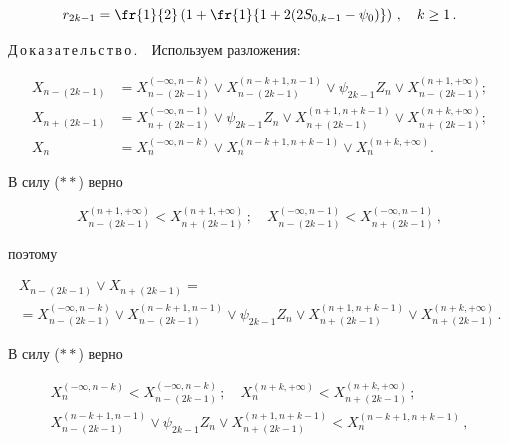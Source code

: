 $$


r_{2k-1}=\fr{1}{2}\left(1+\fr{1}{1+2(2S_{0,k-1}-\psi_0)}\right)\,,\quad 


k\ge 1\,.


$$





\noindent


Д\,о\,к\,а\,з\,а\,т\,е\,л\,ь\,с\,т\,в\,о\,.\ \ Используем разложения:


\begin{align*}


X_{n-(2k-1)}&=


X_{n-(2k-1)}^{(-\infty,n-k)}\vee X_{n-(2k-1)}^{(n-k+1,n-1)}\vee 


\psi_{2k-1}Z_n\vee X_{n-(2k-1)}^{(n+1,+\infty)};\\


X_{n+(2k-1)}&=


X_{n+(2k-1)}^{(-\infty,n-1)}\vee \psi_{2k-1} Z_n\vee X_{n+(2k-1)}^{(n+1,n+k-1)}


\vee X_{n+(2k-1)}^{(n+k,+\infty)};\\ 


X_n&=X_n^{(-\infty,n-k)}\vee X_n^{(n-k+1,n+k-1)}\vee X_n^{(n+k,+\infty)}.


\end{align*}


В силу ($**$) верно


$$


X_{n-(2k-1)}^{(n+1,+\infty)}<X_{n+(2k-1)}^{(n+1,+\infty)}\,;\quad


X_{n-(2k-1)}^{(-\infty,n-1)}<X_{n+(2k-1)}^{(-\infty,n-1)}\,,


$$


поэтому


\begin{multline*}


X_{n-(2k-1)}\vee X_{n+(2k-1)}={}\\


{}=


X_{n-(2k-1)}^{(-\infty,n-k)}\vee X_{n-(2k-1)}^{(n-k+1,n-1)}\vee \psi_{2k-1}Z_n\vee


X_{n+(2k-1)}^{(n+1,n+k-1)}\vee X_{n+(2k-1)}^{(n+k,+\infty)}\,.


\end{multline*}


В силу ($**$) верно


\begin{gather*}


X_n^{(-\infty,n-k)}<X_{n-(2k-1)}^{(-\infty,n-k)}\,;\quad


X_n^{(n+k,+\infty)}<X_{n+(2k-1)}^{(n+k,+\infty)}\,;\\


X_{n-(2k-1)}^{(n-k+1,n-1)}\vee \psi_{2k-1}Z_n\vee X_{n+(2k-1)}^{(n+1,n+k-1)}<X_n^{(n-k+1,n+k-1)}\,,


\end{gather*}


